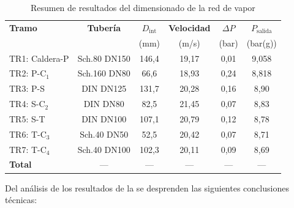 \begin{table}[H]
	\centering
	\caption{Resumen de resultados del dimensionado de la red de vapor}
	\label{tab:conclusiones-red-vapor}
	\begin{tabular}{lccccc}
		\toprule
		\textbf{Tramo} & \textbf{Tubería} & \textbf{$D_{\text{int}}$} & \textbf{Velocidad} & \textbf{$\Delta P$} & \textbf{$P_{\text{salida}}$} \\
		               &                  & (mm)                      & (m/s)              & (bar)               & (bar(g))                     \\
		\midrule
		TR1: Caldera-P & Sch.80 DN150     & 146,4                     & 19,17              & 0,01                & 9,058                        \\
		TR2: P-C$_1$   & Sch.160 DN80     & 66,6                      & 18,93              & 0,24                & 8,818                        \\
		TR3: P-S       & DIN DN125        & 131,7                     & 20,28              & 0,16                & 8,90                         \\
		TR4: S-C$_2$   & DIN DN80         & 82,5                      & 21,45              & 0,07                & 8,83                         \\
		TR5: S-T       & DIN DN100        & 107,1                     & 20,79              & 0,12                & 8,78                         \\
		TR6: T-C$_3$   & Sch.40 DN50      & 52,5                      & 20,42              & 0,07                & 8,71                         \\
		TR7: T-C$_4$   & Sch.40 DN100     & 102,3                     & 20,11              & 0,09                & 8,69                         \\
		\midrule
		\textbf{Total} & ---              & ---                       & ---                & ---                 & ---                          \\
		\bottomrule
	\end{tabular}
\end{table}

Del análisis de los resultados de la  se desprenden las siguientes conclusiones técnicas:

